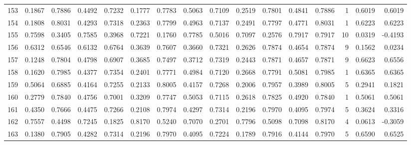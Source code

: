 \begin{tabular}{lrrrrrrrrrrrrrrr}
153 &      0.1867 &  0.7886 &  0.4492 &  0.7232 &  0.1777 &  0.7783 &  0.5063 &  0.7109 &  0.2519 &  0.7801 &   0.4841 &     0.7886 &      1 &                    0.6019 &                     0.6019 \\
154 &      0.1808 &  0.8031 &  0.4293 &  0.7318 &  0.2363 &  0.7799 &  0.4963 &  0.7137 &  0.2491 &  0.7797 &   0.4771 &     0.8031 &      1 &                    0.6223 &                     0.6223 \\
155 &      0.7598 &  0.3405 &  0.7585 &  0.3968 &  0.7221 &  0.1760 &  0.7785 &  0.5016 &  0.7097 &  0.2576 &   0.7917 &     0.7917 &     10 &                    0.0319 &                    -0.4193 \\
156 &      0.6312 &  0.6546 &  0.6132 &  0.6764 &  0.3639 &  0.7607 &  0.3660 &  0.7321 &  0.2626 &  0.7874 &   0.4654 &     0.7874 &      9 &                    0.1562 &                     0.0234 \\
157 &      0.1248 &  0.7804 &  0.4798 &  0.6907 &  0.3685 &  0.7497 &  0.3712 &  0.7319 &  0.2443 &  0.7871 &   0.4657 &     0.7871 &      9 &                    0.6623 &                     0.6556 \\
158 &      0.1620 &  0.7985 &  0.4377 &  0.7354 &  0.2401 &  0.7771 &  0.4984 &  0.7120 &  0.2668 &  0.7791 &   0.5081 &     0.7985 &      1 &                    0.6365 &                     0.6365 \\
159 &      0.5064 &  0.6885 &  0.4164 &  0.7255 &  0.2133 &  0.8005 &  0.4157 &  0.7268 &  0.2006 &  0.7957 &   0.3989 &     0.8005 &      5 &                    0.2941 &                     0.1821 \\
160 &      0.2779 &  0.7840 &  0.4756 &  0.7001 &  0.3209 &  0.7747 &  0.5053 &  0.7115 &  0.2618 &  0.7825 &   0.4920 &     0.7840 &      1 &                    0.5061 &                     0.5061 \\
161 &      0.4350 &  0.7666 &  0.4475 &  0.7266 &  0.2108 &  0.7974 &  0.4297 &  0.7314 &  0.2196 &  0.7970 &   0.4095 &     0.7974 &      5 &                    0.3624 &                     0.3316 \\
162 &      0.7557 &  0.4498 &  0.7245 &  0.1825 &  0.8170 &  0.5240 &  0.7070 &  0.2701 &  0.7796 &  0.5098 &   0.7098 &     0.8170 &      4 &                    0.0613 &                    -0.3059 \\
163 &      0.1380 &  0.7905 &  0.4282 &  0.7314 &  0.2196 &  0.7970 &  0.4095 &  0.7224 &  0.1789 &  0.7916 &   0.4144 &     0.7970 &      5 &                    0.6590 &                     0.6525 \\

\end{tabular}
